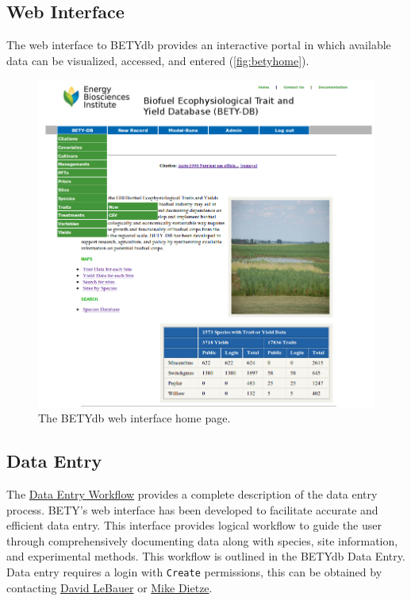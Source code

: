 \documentclass[10pt]{article}
\begin{document}
\subsection{Web Interface}

 The web interface to BETYdb provides an interactive portal in which available data can be visualized, accessed, and entered (\autoref{fig:betyhome}).

\begin{centering}
  \begin{figure}[h]
    \includegraphics[width=5in]{betyhome.png}
    \caption{The BETYdb web interface home page.}
    \label{fig:betyhome}
  \end{figure}
\end{centering}

\subsection{Data Entry}

The \href{http://dl.dropbox.com/u/18092793/dbdocumentation_data_entry.pdf}{Data Entry Workflow} provides a complete description of the data entry process.
BETY's web interface has been developed to facilitate accurate and efficient data entry.
 This interface provides logical workflow to guide the user through comprehensively documenting data along with species, site information, and experimental methods.
 This workflow is outlined in the BETYdb Data Entry.
 Data entry requires a login with \verb+Create+ permissions, this can be obtained by contacting \href{mailto:dlebauer@illinois.edu}{David LeBauer} or \href{mailto:mdietze@illinois.edu}{Mike Dietze}.
\end{document}
